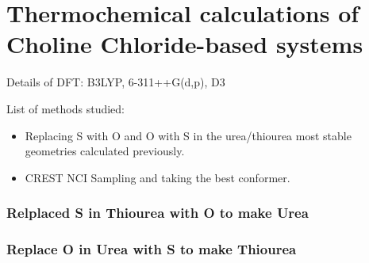 \section{Thermochemical calculations of Choline Chloride-based systems}
\label{sec:thermochemical-calculations}
Details of DFT: B3LYP, 6-311++G(d,p), D3

List of methods studied:
\begin{itemize}
    \item Replacing S with O and O with S in the urea/thiourea most stable geometries calculated previously.
    \item CREST NCI Sampling and taking the best conformer.
\end{itemize}
\subsubsection*{Relplaced S in Thiourea with O to make Urea}
\begin{table}[h!]
    \centering
    \caption{Urea Systems: Comparing energies of new geometries to the old ones and also CREST generated geometries.}
\end{table}
\subsubsection*{Replace O in Urea with S to make Thiourea}
\begin{table}[h!]
    \centering
    \caption{Thiourea Systems: Comparing energies of new geometries to the old ones and also CREST generated geometries.}
\end{table}